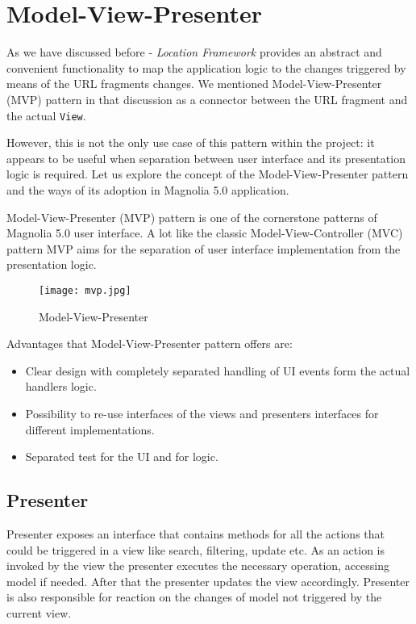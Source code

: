 \section{Model-View-Presenter}
\label{MVP}
As we have discussed before - \emph{Location Framework} provides an abstract and
convenient functionality to map the application logic to the changes triggered
by means of the URL fragments changes. We mentioned Model-View-Presenter (MVP)
pattern in that discussion as a connector between the URL fragment and the
actual \texttt{View}.

However, this is not the only use case of this pattern within the project: it
appears to be useful when separation between user interface and its presentation
logic is required. Let us explore the concept of the Model-View-Presenter
pattern and the ways of its adoption in Magnolia 5.0 application.

Model-View-Presenter (MVP) pattern is one of the cornerstone patterns of
Magnolia 5.0 user interface. A lot like the classic Model-View-Controller (MVC)
pattern MVP aims for the separation of user interface implementation from the
presentation logic.
\begin{figure}[H] \centering \texttt{[image: mvp.jpg]}
	\caption{Model-View-Presenter}
	\label{fig:mvp}
\end{figure}
Advantages that Model-View-Presenter pattern offers are:
\begin{itemize}
  \item Clear design with completely separated handling of UI events form the actual handlers logic.
  \item Possibility to re-use interfaces of the views and presenters interfaces for different implementations.
  \item Separated test for the UI and for logic. 
\end{itemize}

\subsection{Presenter} Presenter exposes an interface that contains methods for all the actions that could be triggered in a view
like search, filtering, update etc. As an action is invoked by the view the presenter executes the necessary operation,
accessing model if needed. After that the presenter updates the view accordingly. Presenter is also responsible for
reaction on the changes of model not triggered by the current view.

